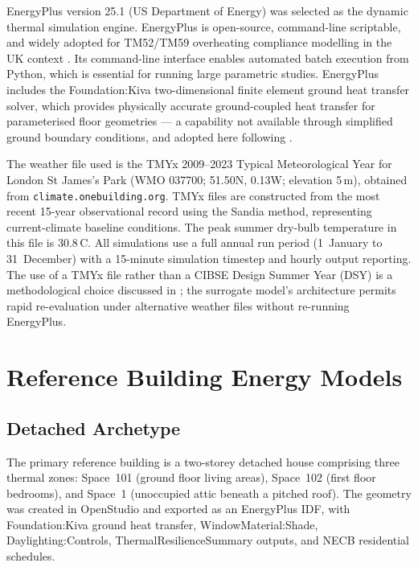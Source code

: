 \documentclass[12pt,a4paper]{report}
\begin{document}
EnergyPlus version 25.1 (US Department of Energy) was selected as the dynamic thermal simulation engine. EnergyPlus is open-source, command-line scriptable, and widely adopted for TM52/TM59 overheating compliance modelling in the UK context \citep{Symonds2016,Botti2022}. Its command-line interface enables automated batch execution from Python, which is essential for running large parametric studies. EnergyPlus includes the Foundation:Kiva two-dimensional finite element ground heat transfer solver, which provides physically accurate ground-coupled heat transfer for parameterised floor geometries --- a capability not available through simplified ground boundary conditions, and adopted here following \citet{Lawrence2021}.

The weather file used is the TMYx 2009--2023 Typical Meteorological Year for London St James's Park (WMO 037700; 51.50\textdegree N, 0.13\textdegree W; elevation 5\,m), obtained from \texttt{climate.onebuilding.org}. TMYx files are constructed from the most recent 15-year observational record using the Sandia method, representing current-climate baseline conditions. The peak summer dry-bulb temperature in this file is 30.8\,\textdegree C. All simulations use a full annual run period (1~January to 31~December) with a 15-minute simulation timestep and hourly output reporting. The use of a TMYx file rather than a CIBSE Design Summer Year (DSY) is a methodological choice discussed in ; the surrogate model's architecture permits rapid re-evaluation under alternative weather files without re-running EnergyPlus.


\section{Reference Building Energy Models}
\label{sec:reference-models}

\subsection{Detached Archetype}
\label{sec:detached}

The primary reference building is a two-storey detached house comprising three thermal zones: Space~101 (ground floor living areas), Space~102 (first floor bedrooms), and Space~1 (unoccupied attic beneath a pitched roof). The geometry was created in OpenStudio and exported as an EnergyPlus IDF, with Foundation:Kiva ground heat transfer, WindowMaterial:Shade, Daylighting:Controls, ThermalResilienceSummary outputs, and NECB residential schedules.
\end{document}
